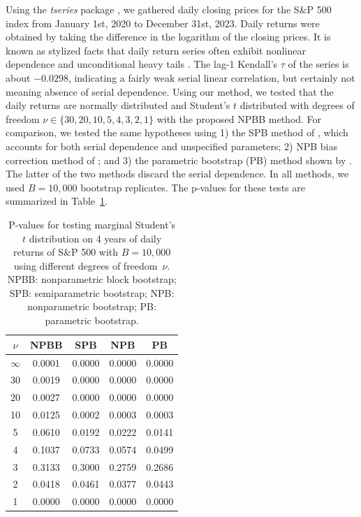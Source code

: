 \documentclass[12pt]{article}
\begin{document}
Using the \textsl{tseries} package \citep{tseries},
we gathered daily closing prices for the S\&P 500 index from January 1st, 2020
to December 31st, 2023. Daily returns were obtained by taking the difference in
the logarithm of the closing prices.
It is known as stylized facts that daily return series often exhibit nonlinear
dependence and unconditional heavy tails \citep[e.g.,][]{ryden1998stylized,
  cont2001empirical}. The lag-1 Kendall's $\tau$ of the series is
about $-0.0298$, indicating a fairly weak serial linear correlation, but
certainly not meaning absence of serial dependence.
Using our method, we tested that the daily returns are normally
distributed and Student's $t$ distributed
with degrees of freedom $\nu \in \{30, 20, 10, 5, 4, 3, 2, 1\}$
with the proposed NPBB method.
For comparison, we tested the same hypotheses using 1) the
SPB method of \citet{zeimbekakis2024misuses},
which accounts for both serial dependence and unspecified parameters;
2) NPB bias correction method of
\citet{babu2004goodness}; and 3) the parametric bootstrap (PB) method shown
by \citet{zeimbekakis2024misuses}. The latter of the two methods discard the
serial dependence. In all methods, we used $B = 10,000$ bootstrap replicates.
The p-values for these tests are summarized in
Table~\ref{table:SP5004}.

\begin{table}[ht]
\centering
\caption{P-values for testing marginal Student's $t$ distribution on
  4 years of daily returns of S\&P 500 with $B = 10,000$
  using different degrees of freedom~$\nu$.
  NPBB: nonparametric block bootstrap;
  SPB: semiparametric bootstrap;
  NPB: nonparametric bootstrap;
  PB: parametric bootstrap.}
\label{table:SP5004}
\begin{tabular}{ccccc}
  \toprule
$\nu$ & NPBB & SPB & NPB & PB\\
  \midrule
$\infty$ & 0.0001 & 0.0000 & 0.0000 & 0.0000 \\
  30 & 0.0019 & 0.0000 & 0.0000 & 0.0000 \\
  20 & 0.0027 & 0.0000 & 0.0000 & 0.0000 \\
  10 & 0.0125 & 0.0002 & 0.0003 & 0.0003 \\
  5 & 0.0610 & 0.0192 & 0.0222 & 0.0141 \\
  4 & 0.1037 & 0.0733 & 0.0574 & 0.0499 \\
  3 & 0.3133 & 0.3000 & 0.2759 & 0.2686 \\
  2 & 0.0418 & 0.0461 & 0.0377 & 0.0443 \\
  1 & 0.0000 & 0.0000 & 0.0000 & 0.0000 \\
  \bottomrule
\end{tabular}
\end{table}
\end{document}
